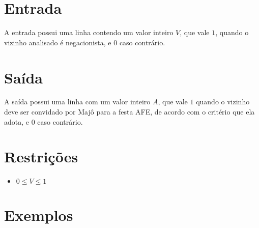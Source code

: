 \section*{Entrada}

A entrada possui uma linha contendo um valor inteiro $V$, que vale $1$, quando o vizinho analisado é negacionista, e $0$ caso contrário.

\section*{Saída}

A saída possui uma linha com um valor inteiro $A$, que vale $1$ quando o vizinho deve ser convidado por Majô para a festa AFE, de acordo com o critério que ela adota, e $0$ caso contrário.

\section*{Restrições}

\begin{itemize}
	\item $0 \leq V \leq 1$
\end{itemize}


\section*{Exemplos}

\exemplo
